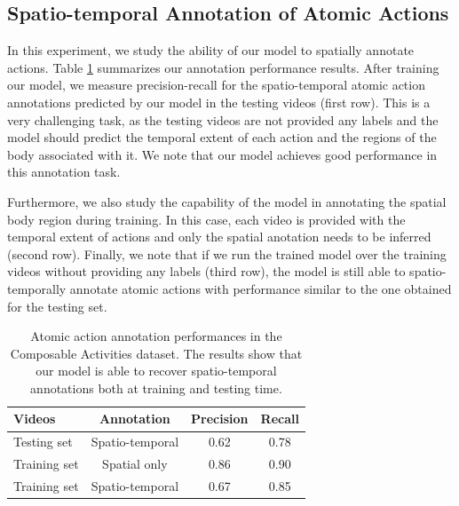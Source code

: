 \subsection{Spatio-temporal Annotation of Atomic Actions}
In this experiment, we study the ability of our model to spatially annotate
actions.
Table \ref{tab:annotation} summarizes our annotation performance
results.
After training our model, we measure precision-recall for the spatio-temporal
atomic action annotations predicted by our model in the testing videos
(first row).
This is a very challenging task, as
the testing videos are not provided any labels and the model
should predict the temporal extent of each action and the regions of the
body associated with it. We note that our model achieves good performance
in this annotation task.

Furthermore, we also study the capability of the model in annotating
the spatial body region during training. In this case, each video is provided
with the temporal extent of actions and only the spatial anotation needs to
be inferred (second row).
Finally, we note that if we run the trained model over the training videos
without providing any labels (third row), the model is still able to
spatio-temporally annotate atomic actions with performance similar to the
one obtained for the testing set.


\begin{table}[tb]
\footnotesize
\centering
\begin{tabular}{|l|c|c|c|}
\hline
\textbf{Videos} & \textbf{Annotation} & \textbf{Precision} & \textbf{Recall}\\
\hline
Testing set & Spatio-temporal   & 0.62 & 0.78 \\
\hline
Training set & Spatial only & 0.86 & 0.90\\
Training set & Spatio-temporal & 0.67 & 0.85 \\
\hline
\end{tabular}
\caption{
\footnotesize
Atomic action annotation performances in the Composable Activities
dataset. The results show that our model is able to recover spatio-temporal
annotations both at training and testing time.}
\label{tab:annotation}
\vspace{-3mm}
\end{table}


